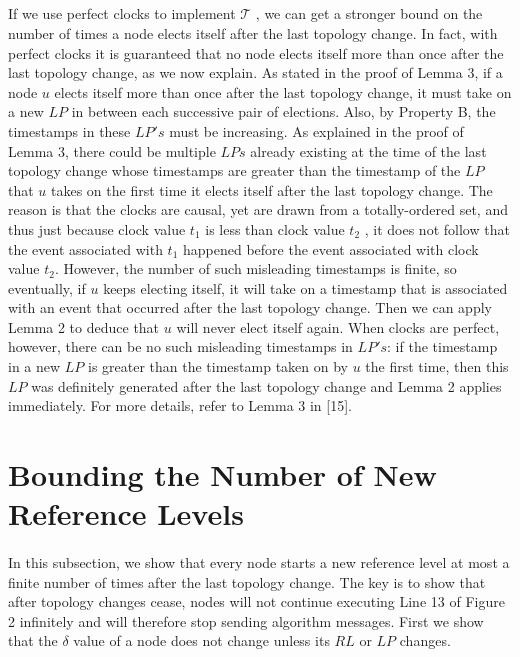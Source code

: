 \subparagraph{}If we use perfect clocks to implement $\mathcal{T}$ , we can get a stronger bound on the number of times a node elects itself after the last topology change. In fact, with perfect clocks it is guaranteed that no node elects itself more than once after the last topology change, as we now explain. As stated in the proof of Lemma 3, if a node $u$ elects itself more than once after the last topology change, it must take on a new $LP$ in between each successive pair of elections. Also, by Property B, the timestamps in these $LP's$ must be increasing. As explained in the proof of Lemma 3, there could be multiple $LPs$ already existing at the time of the last topology change whose timestamps are greater than the timestamp of the $LP$ that $u$ takes on the first time it elects itself after the last topology change. The reason is that the clocks are causal, yet are drawn from a totally-ordered set, and thus just because clock value $t_1$ is less than clock value $t_2$ , it does not follow that the event associated with $t_1$ happened before the event associated with clock value $t_2$. However, the number of such misleading timestamps is finite, so eventually, if $u$ keeps electing itself, it will take on a timestamp that is associated with an event that occurred after the last topology change. Then we can apply Lemma 2 to deduce that $u$ will never elect itself again. When clocks are perfect, however, there can be no such misleading timestamps in $LP's$: if the timestamp in a new $LP$ is greater than the timestamp taken on by $u$ the first time, then this $LP$ was definitely generated after the last topology change and Lemma 2 applies immediately. For more details, refer to Lemma 3 in [15].
\section{Bounding the Number of New Reference Levels}
\paragraph{}In this subsection, we show that every node starts a new reference level at most a finite number of times after the last topology change. The key is to show that after topology changes cease, nodes will not continue executing Line 13 of Figure 2 infinitely and will therefore stop sending algorithm messages. First we show that the $\delta$ value of a node does not change unless its $RL$ or $LP$ changes.
